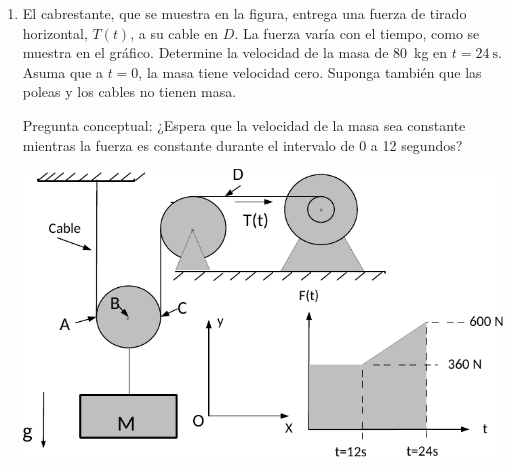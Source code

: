 \documentclass[11pt,spanish,a4paper]{article}
\begin{document}
\begin{enumerate}
\item
\begin{minipage}[t][6cm]{0.5\textwidth}
El cabrestante, que se muestra en la figura, entrega una fuerza de tirado horizontal, $T(t)$, a su cable en $D$.
La fuerza varía con el tiempo, como se muestra en el gráfico.
Determine la velocidad de la masa de \SI{80}{\kilo\gram} en $t=\SI{24}{\second}$.
Asuma que a $t=0$, la masa tiene velocidad cero.
Suponga también que las poleas y los cables no tienen masa.

Pregunta conceptual:
¿Espera que la velocidad de la masa sea constante mientras la fuerza es constante durante el intervalo de 0 a 12 segundos?
\end{minipage}
\begin{minipage}[c][0cm][t]{0.45\textwidth}
	\includegraphics[width=\textwidth]{MIT2_003SCF11_pset3_e02}
\end{minipage}



\end{enumerate}
\end{document}
